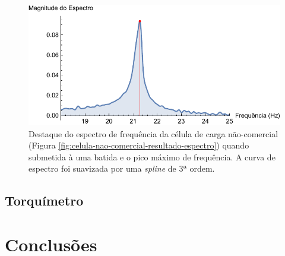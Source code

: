 \documentclass[a4paper]{instrumentacao}
\begin{document}
\begin{figure}[H]
\center
\includegraphics[width=\textwidth]{NaoComercial-SpectrumHighlight.pdf}
\caption{Destaque do espectro de frequência da célula de carga não-comercial (Figura \ref{fig:celula-nao-comercial-resultado-espectro}) quando submetida à uma batida e o pico máximo de frequência. A curva de espectro foi suavizada por uma \textit{spline} de 3ª ordem.}
\label{fig:celula-nao-comercial-resultado-espectro-destaque}
\end{figure}

\section{Torquímetro}

\chapter{Conclusões}
\end{document}
